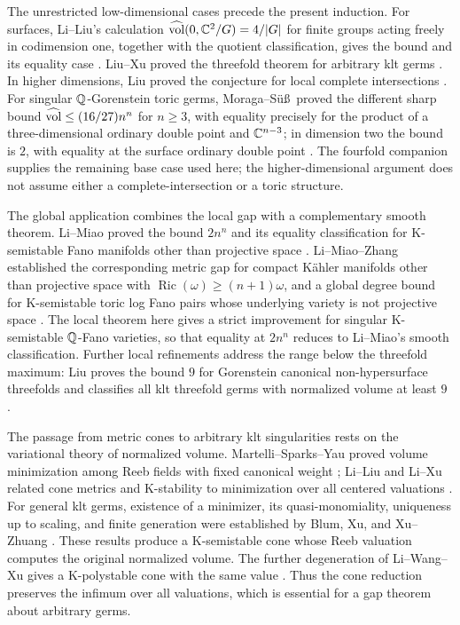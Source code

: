 The unrestricted low-dimensional cases precede the present induction.
For surfaces, Li--Liu's calculation
\(\widehat{\operatorname{vol}}(0,\mathbb C^2/G)=4/|G|\) for finite groups acting freely in
codimension one, together with the quotient classification, gives
the bound and its equality case
\cite[Proposition~4.10]{LL19}. Liu--Xu proved the threefold theorem
for arbitrary klt germs \cite[Theorem~1.3]{LX19}.
In higher dimensions, Liu proved the conjecture for local complete
intersections \cite[Theorem~1.3]{Liu22}. For singular \(\mathbb Q\)-Gorenstein toric germs,
Moraga--S\"u\ss\ proved the different sharp bound
\(\widehat{\operatorname{vol}}\le(16/27)n^n\) for \(n\ge3\), with equality precisely
for the product of a three-dimensional ordinary double point and
\(\mathbb C^{n-3}\); in dimension two the bound is \(2\), with equality
at the surface ordinary double point
\cite[Theorem~2]{MoragaSuess24}. The fourfold companion supplies
the remaining base case used here; the higher-dimensional argument
does not assume either a complete-intersection or a toric structure.

The global application combines the local gap with a complementary
smooth theorem. Li--Miao proved the bound \(2n^n\) and its equality
classification for K-semistable Fano manifolds other than projective
space \cite[Theorem~1.1]{LM25}. Li--Miao--Zhang established the
corresponding metric gap for compact K\"ahler manifolds other than
projective space with \(\operatorname{Ric}(\omega)\ge(n+1)\omega\),
and a global degree bound for K-semistable toric log Fano pairs
whose underlying variety is not projective space
\cite[Theorems~1.3 and~1.6]{LiMiaoZhang26}.
The local theorem here gives a strict improvement for singular
K-semistable \(\mathbb Q\)-Fano varieties, so that equality at \(2n^n\)
reduces to Li--Miao's smooth classification.
Further local refinements address the range below the threefold
maximum: Liu proves the bound \(9\) for Gorenstein canonical
non-hypersurface threefolds and classifies all klt threefold germs
with normalized volume at least \(9\)
\cite[Theorems~1.1 and~1.2]{LiuThreefold26}.

The passage from metric cones to arbitrary klt singularities rests
on the variational theory of normalized volume. Martelli--Sparks--Yau
proved volume minimization among Reeb fields with fixed canonical
weight \cite{MSY08}; Li--Liu and Li--Xu related cone metrics and
K-stability to minimization over all centered valuations
\cite[Theorem~1.9]{LL19}\cite[Theorem~1.3]{LiXu18}.
For general klt germs, existence of a minimizer, its
quasi-monomiality, uniqueness up to scaling, and finite generation
were established by Blum, Xu, and Xu--Zhuang
\cite{Blum18,Xu20,XZ21,XZStable}.
These results produce a K-semistable cone whose Reeb valuation
computes the original normalized volume. The further degeneration
of Li--Wang--Xu gives a K-polystable cone with the same value
\cite[Theorem~1.2]{LWX21}.
Thus the cone reduction preserves the infimum over all valuations,
which is essential for a gap theorem about arbitrary germs.

